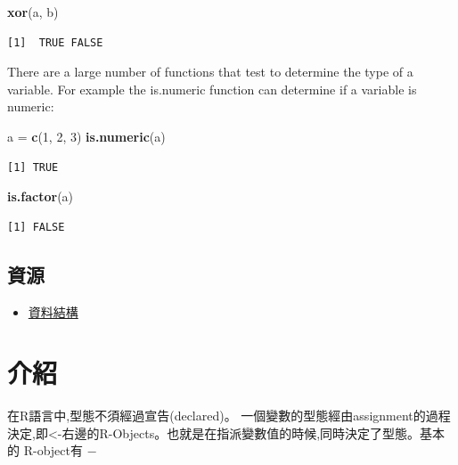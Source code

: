 \documentclass[]{book}
\newenvironment{Shaded}{\begin{snugshade}}{\end{snugshade}}
\newcommand{\DecValTok}[1]{\textcolor[rgb]{0.00,0.00,0.81}{#1}}
\newcommand{\KeywordTok}[1]{\textcolor[rgb]{0.13,0.29,0.53}{\textbf{#1}}}
\newcommand{\NormalTok}[1]{#1}
\newcommand{\StringTok}[1]{\textcolor[rgb]{0.31,0.60,0.02}{#1}}
\providecommand{\tightlist}{%
  \setlength{\itemsep}{0pt}\setlength{\parskip}{0pt}}
\theoremstyle{definition}
\theoremstyle{definition}
\theoremstyle{definition}
\theoremstyle{remark}
\begin{document}
\begin{Shaded}
\begin{Highlighting}[]
\KeywordTok{xor}\NormalTok{(a, b)}
\end{Highlighting}
\end{Shaded}

\begin{verbatim}
[1]  TRUE FALSE
\end{verbatim}

There are a large number of functions that test to determine the type of
a variable. For example the is.numeric function can determine if a
variable is numeric:

\begin{Shaded}
\begin{Highlighting}[]
\NormalTok{a =}\StringTok{ }\KeywordTok{c}\NormalTok{(}\DecValTok{1}\NormalTok{, }\DecValTok{2}\NormalTok{, }\DecValTok{3}\NormalTok{)}
\KeywordTok{is.numeric}\NormalTok{(a)}
\end{Highlighting}
\end{Shaded}

\begin{verbatim}
[1] TRUE
\end{verbatim}

\begin{Shaded}
\begin{Highlighting}[]
\KeywordTok{is.factor}\NormalTok{(a)}
\end{Highlighting}
\end{Shaded}

\begin{verbatim}
[1] FALSE
\end{verbatim}

\subsection{資源}

\begin{itemize}
\tightlist
\item
  \href{http://adv-r.had.co.nz/Data-structures.html}{資料結構}
\end{itemize}

\section{介紹}

在R語言中,型態不須經過宣告(declared)。
一個變數的型態經由assignment的過程決定,即\textless{}-右邊的R-Objects。也就是在指派變數值的時候,同時決定了型態。基本的
R-object有 −
\end{document}
